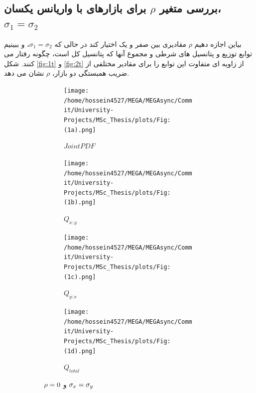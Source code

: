 \documentclass[a4paper,titlepage,12pt,fleqn,oneside]{report}
\begin{document}
\subsection{
بررسی متغیر 
$\rho$
 برای بازارهای با واریانس یکسان،
$\sigma_1 = \sigma_2$
}
بیاین اجازه دهیم 
$\rho$
مقادیری بین صفر و یک اختیار کند در حالی که 
$\sigma_1 = \sigma_2$،
و ببینیم توابع توزیع و پتانسیل های شرطی و مجموع آنها که پتانسیل کل است، چگونه رفتار می کنند. شکل 
\ref{fig:1t}
و 
\ref{fig:2t}
از زاویه ای متفاوت این توابع را برای مقادیر مختلفی از ضریب همبستگی دو بازار،
$\rho$
 نشان می دهد. 
  \begin{figure}[tbp]
  	\centering
  	\begin{subfigure}[b]{\textwidth}
  		\renewcommand\thesubfigure{a}
  		\begin{subfigure}[b]{0.24\textwidth}
  			\renewcommand\thesubfigure{i}
  			\centering
  			\texttt{[image: /home/hossein4527/MEGA/MEGAsync/Commit/University-Projects/MSc\_Thesis/plots/Fig:(1a).png]}
  			\caption{$Joint PDF$}
  			\label{fig:1.1.1}
  		\end{subfigure}
  		\hfill
  		\begin{subfigure}[b]{0.24\textwidth}
  			\renewcommand\thesubfigure{ii}
  			\centering
  			\texttt{[image: /home/hossein4527/MEGA/MEGAsync/Commit/University-Projects/MSc\_Thesis/plots/Fig:(1b).png]}
  			\caption{$Q_{x:y}$}
  			\label{fig:1.1.2}
  		\end{subfigure}
  		\hfill
  		\begin{subfigure}[b]{0.24\textwidth}
  			\renewcommand\thesubfigure{iii}
  			\centering
  			\texttt{[image: /home/hossein4527/MEGA/MEGAsync/Commit/University-Projects/MSc\_Thesis/plots/Fig:(1c).png]}
  			\caption{$Q_{y:x}$}
  			\label{fig:1.1.3}
  		\end{subfigure}
  		\hfill
  		\begin{subfigure}[b]{0.24\textwidth}
  			\renewcommand\thesubfigure{iv}
  			\centering
  			\texttt{[image: /home/hossein4527/MEGA/MEGAsync/Commit/University-Projects/MSc\_Thesis/plots/Fig:(1d).png]}
  			\caption{$Q_{total}$}
  			\label{fig:1.1.4}
  		\end{subfigure}
  		\caption{$\protect\rho =0$ و $\protect\sigma _{x}=\protect\sigma _{y}$}
  		\label{fig:1.1}
  	\end{subfigure}
  	\begin{subfigure}[b]{\textwidth}
  		\renewcommand\thesubfigure{b}
  		\begin{subfigure}[b]{0.24\textwidth}
  			\renewcommand\thesubfigure{i}
  			\centering

\end{subfigure}
\end{subfigure}
\end{figure}
\end{document}
